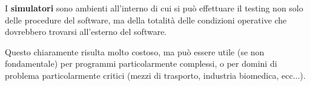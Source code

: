 \documentclass[a4paper,11pt]{article}
\begin{document}
I \textbf{simulatori} sono ambienti all'interno di cui si può effettuare il testing non solo delle procedure del software, ma della totalità delle condizioni operative che dovrebbero trovarsi all'esterno del software.

Questo chiaramente risulta molto costoso, ma può essere utile (se non fondamentale) per programmi particolarmente complessi, o per domini di problema particolarmente critici (mezzi di trasporto, industria biomedica, ecc...).
\end{document}
